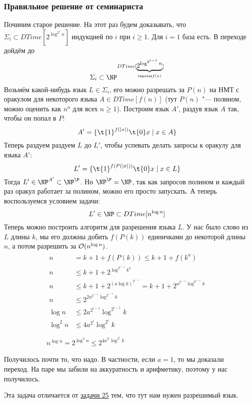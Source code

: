 	\subsubsection{Правильное решение от семинариста}
		Починим старое решение.
		На этот раз будем доказывать, что $\Sigma_i \subset DTime[2^{\log^{2^i} n}]$ индукцией по $i$ при $i\ge 1$.
		Для $i = 1$ база есть.
		В переходе дойдём до
		\[ \Sigma_i \subset \NP^{DTime[\underbrace{2^{\log^{2^{i-1}} n}}_{\eqcolon f(n)}]} \]
		Возьмём какой-нибудь язык $L\in\Sigma_i$, его можно разрешать за $P(n)$ на НМТ
		с оракулом для некоторого языка $A \in DTime[f(n)]$ (тут $P(n)$ "--- полином, можно оценить как $n^a$ для всех $n \ge 1$).
		Построим язык $A'$, раздув язык $A$ так, чтобы он попал в $P$:
		\[ A' = \{ \t{1}^{f(|x|)}\t{0}x \mid x \in A \} \]
		Теперь раздуем раздуем $L$ до $L'$, чтобы успевать делать запросы к оракулу для языка $A'$:
		\[
			L' = \{ \t{1}^{f(P(|x|))}\t{0} x \mid x \in L \}
		\]
		Тогда $L' \in \NP^{A'} \subset \NP^\P$.
		Но $\NP^\P=\NP$, так как запросов полином и каждый раз оракул работает за полином, можно его просто запускать.
		А теперь воспользуемся условием задачи:
		\[ L' \in \NP \subset DTime[n^{\log n}] \]
		Теперь можно построить алгоритм для разрешения языка $L$.
		У нас было слово из $L$ длины $k$, мы его должны добить $f(P(k))$ единичками до некоторой длины $n$, а потом разрешить за $\mathcal O(n^{\log n})$.
		\begin{gather*}
			\begin{aligned}
				n &= k + 1 + f(P(k)) \le k + 1 + f(k^a) \\
				n &\le k + 1 + 2^{\log^{2^{i-1}} k^a} \\
				n &\le k + 1 + 2^{\left(a \log k\right)^{2^{i-1}}} =
					k + 1 + 2^{a^{2^{i-1}} \log^{2^{i-1}} k} \\
				n &\le 2^{2a^{2^{i-1}} \log^{2^{i-1}} k} \\
				\log n &\le 2a^{2^{i-1}} \log^{2^{i-1}} k \\
				\log^2 n &\le 4a^{2^i} \log^{2^i} k \\
			\end{aligned} \\
			n^{\log n} = 2^{\log^2n} \le 2^{4a^{2^i} \log^{2^i} k}
		\end{gather*}
		\TODO

		Получилось почти то, что надо.
		В частности, если $a=1$, то мы доказали переход.
		На паре мы забили на аккуратность и арифметику, поэтому у нас получилось.

	Эта задача отличается от \hyperref[prob25]{задачи 25} тем, что тут нам нужен разрешимый язык.
